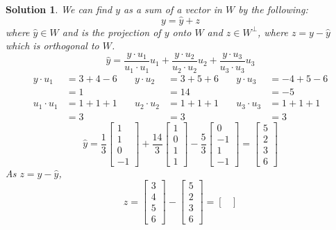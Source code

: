\documentclass[11pt]{scrartcl}
\theoremstyle{dotlessP}
\newtheorem{sol}{Solution}[section]
\theoremstyle{dotlessN}
\begin{document}
\begin{sol}
	We can find $y$ as a sum of a vector in $W$ by the following:
	\[
		y = \hat{y} + z
	\] 
	where $\hat{y} \in W$ and is the projection of $y$ onto $W$ and $z \in W^\perp$, where $z = y - \hat{y}$ which is orthogonal to $W$.
	\[
		\hat{y} = \frac{y \cdot u_1}{u_1 \cdot u_1} u_1 + 
\frac{y \cdot u_2}{u_2 \cdot u_2} u_2 + \frac{y \cdot u_3}{u_3 \cdot u_3} u_3  
	\] 
	\begin{align*}
		y \cdot u_1 &= 3 + 4 -6 &\quad y \cdot u_2 &= 3 + 5 + 6 &\quad y \cdot u_3 &= -4+ 5 - 6 \\
					&= 1 &\quad &= 14 &\quad &= -5 \\
		u_1 \cdot u_1 &= 1 + 1 + 1 &\quad u_2 \cdot u_2 &= 1 + 1 + 1 &\quad u_3 \cdot u_3 &= 1 + 1 + 1 \\
					  &= 3 &\quad &= 3 &\quad &= 3
	\end{align*}
	\[
		\hat{y} = \frac{1}{3} 
		\begin{bmatrix}
			1 \\
			1 \\
			0 \\
			-1
		\end{bmatrix} + 
		\frac{14}{3} 
		\begin{bmatrix}
			1 \\
			0 \\
			1 \\
			1
		\end{bmatrix} -
		\frac{5}{3}
		\begin{bmatrix}
			0 \\
			-1 \\
			1 \\
			-1
		\end{bmatrix} =
		\begin{bmatrix}
			5 \\
			2 \\
			3 \\
			6
		\end{bmatrix}
	\] 
	As $z = y - \hat{y}$,
	 \[
	z = 
	\begin{bmatrix}
		3 \\
		4\\
		5\\
		6
	\end{bmatrix} -
	\begin{bmatrix}
		5 \\
		2 \\
		3 \\
		6
	\end{bmatrix} = 
	\begin{bmatrix}

\end{bmatrix}\]
\end{sol}
\end{document}
